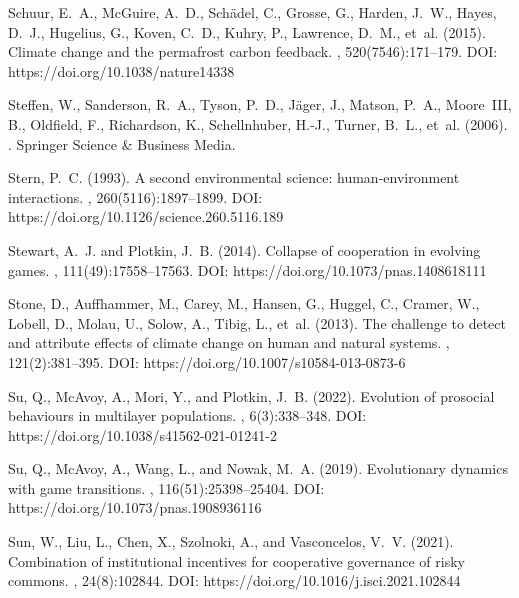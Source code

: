\documentclass[9pt]{elife}
\begin{document}
\begin{thebibliography}{}
Schuur, E.~A., McGuire, A.~D., Sch{\"a}del, C., Grosse, G., Harden, J.~W.,
  Hayes, D.~J., Hugelius, G., Koven, C.~D., Kuhry, P., Lawrence, D.~M., et~al.
  (2015).
\newblock Climate change and the permafrost carbon feedback.
, 520(7546):171--179. DOI: https://doi.org/10.1038/nature14338

Steffen, W., Sanderson, R.~A., Tyson, P.~D., J{\"a}ger, J., Matson, P.~A.,
  Moore~III, B., Oldfield, F., Richardson, K., Schellnhuber, H.-J., Turner,
  B.~L., et~al. (2006).
.
\newblock Springer Science \& Business Media.

Stern, P.~C. (1993).
\newblock A second environmental science: human-environment interactions.
, 260(5116):1897--1899. DOI: https://doi.org/10.1126/science.260.5116.189

Stewart, A.~J. and Plotkin, J.~B. (2014).
\newblock Collapse of cooperation in evolving games.
, 111(49):17558--17563. DOI: https://doi.org/10.1073/pnas.1408618111

Stone, D., Auffhammer, M., Carey, M., Hansen, G., Huggel, C., Cramer, W.,
  Lobell, D., Molau, U., Solow, A., Tibig, L., et~al. (2013).
\newblock The challenge to detect and attribute effects of climate change on
  human and natural systems.
, 121(2):381--395. DOI: https://doi.org/10.1007/s10584-013-0873-6

Su, Q., McAvoy, A., Mori, Y., and Plotkin, J.~B. (2022).
\newblock Evolution of prosocial behaviours in multilayer populations.
, 6(3):338--348. DOI: https://doi.org/10.1038/s41562-021-01241-2

Su, Q., McAvoy, A., Wang, L., and Nowak, M.~A. (2019).
\newblock Evolutionary dynamics with game transitions.
, 116(51):25398--25404. DOI: https://doi.org/10.1073/pnas.1908936116

Sun, W., Liu, L., Chen, X., Szolnoki, A., and Vasconcelos, V.~V. (2021).
\newblock Combination of institutional incentives for cooperative governance of
  risky commons.
, 24(8):102844. DOI: https://doi.org/10.1016/j.isci.2021.102844


\end{thebibliography}
\end{document}
